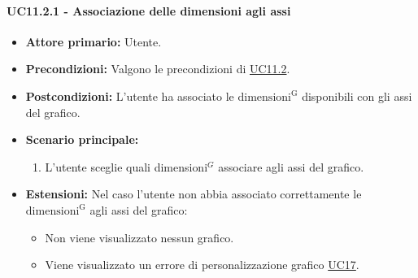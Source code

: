 \paragraph{UC11.2.1 - Associazione delle dimensioni agli assi}
\label{sec:UC11.2.1}
    \begin{itemize}
        \item \textbf{Attore primario:} Utente.
        \item \textbf{Precondizioni:} Valgono le precondizioni di \hyperref[sec:UC11.2]{UC11.2}.
	    \item \textbf{Postcondizioni:} L'utente ha associato le ${\mathrm{dimensioni^{G}}}$ disponibili con gli assi del grafico.
	    \item \textbf{Scenario principale:} 
	    \begin{enumerate}
	    		\item L'utente sceglie quali dimensioni$^{G}$ associare agli assi del grafico.
		\end{enumerate}
	    \item \textbf{Estensioni:} Nel caso l'utente non abbia associato correttamente le ${\mathrm{dimensioni^{G}}}$ agli assi del grafico:
              \begin{itemize}
                  \item Non viene visualizzato nessun grafico.
                  \item Viene visualizzato un errore di personalizzazione grafico \hyperref[sec:UC17 - Errore di personalizzazione]{UC17}.
              \end{itemize}
    \end{itemize}

\newpage

